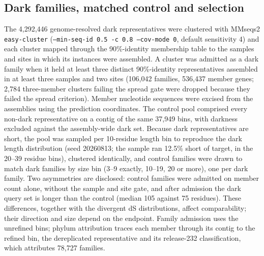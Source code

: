 \documentclass[11pt]{article}
\begin{document}
\subsection*{Dark families, matched control and selection}
The 4{,}292{,}446 genome-resolved dark representatives were clustered with MMseqs2
\texttt{easy-cluster} (\texttt{--min-seq-id 0.5 -c 0.8 --cov-mode 0}, default sensitivity 4) and each
cluster mapped through the 90\%-identity membership table to the samples and sites in which its
instances were assembled. A cluster was admitted as a dark family when it held at least three
distinct 90\%-identity representatives assembled in at least three samples and two sites (106{,}042
families, 536{,}437 member genes; 2{,}784 three-member clusters failing the spread gate were dropped
because they failed the spread criterion). Member nucleotide sequences were excised from the assemblies using the
prediction coordinates. The control pool comprised every non-dark representative on a contig of the
same 37{,}949 bins, with darkness excluded against the assembly-wide dark set. Because dark
representatives are short, the pool was sampled per 10-residue length bin to reproduce the dark
length distribution (seed 20260813; the sample ran 12.5\% short of target, in the 20--39 residue
bins), clustered identically, and control families were drawn to match dark families by size bin
(3--9 exactly, 10--19, 20 or more), one per dark family. Two asymmetries are disclosed: control
families were admitted on member count alone, without the sample and site gate, and after admission
the dark query set is longer than the control (median 105 against 75 residues). These differences, together with the divergent dS distributions, affect comparability; their
direction and size depend on the endpoint. Family admission uses the unrefined bins; phylum attribution traces each member
through its contig to the refined bin, the dereplicated representative and its release-232
classification, which attributes 78{,}727 families.
\end{document}
